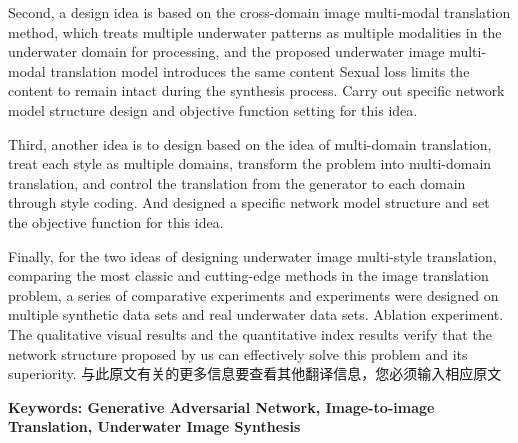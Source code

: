 {Second, a design idea is based on the cross-domain image multi-modal translation method, which treats multiple underwater patterns as multiple modalities in the underwater domain for processing, and the proposed underwater image multi-modal translation model introduces the same content Sexual loss limits the content to remain intact during the synthesis process. Carry out specific network model structure design and objective function setting for this idea.

Third, another idea is to design based on the idea of ​​multi-domain translation, treat each style as multiple domains, transform the problem into multi-domain translation, and control the translation from the generator to each domain through style coding. And designed a specific network model structure and set the objective function for this idea.

Finally, for the two ideas of designing underwater image multi-style translation, comparing the most classic and cutting-edge methods in the image translation problem, a series of comparative experiments and experiments were designed on multiple synthetic data sets and real underwater data sets. Ablation experiment. The qualitative visual results and the quantitative index results verify that the network structure proposed by us can effectively solve this problem and its superiority. 
与此原文有关的更多信息要查看其他翻译信息，您必须输入相应原文


}
 
\vskip12bp
{\xiaosi\heiti\noindent 
\textbf{Keywords: Generative Adversarial Network, Image-to-image Translation, Underwater Image Synthesis}}
